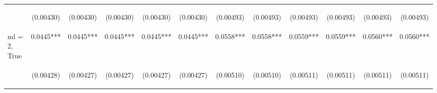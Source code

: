 \documentclass[]{article}
\begin{document}
\begin{center}
\begin{tabular}{lccccccccccc}
\vspace{4pt} & \begin{footnotesize}(0.00430)\end{footnotesize} & \begin{footnotesize}(0.00430)\end{footnotesize} & \begin{footnotesize}(0.00430)\end{footnotesize} & \begin{footnotesize}(0.00430)\end{footnotesize} & \begin{footnotesize}(0.00430)\end{footnotesize} & \begin{footnotesize}(0.00493)\end{footnotesize} & \begin{footnotesize}(0.00493)\end{footnotesize} & \begin{footnotesize}(0.00493)\end{footnotesize} & \begin{footnotesize}(0.00493)\end{footnotesize} & \begin{footnotesize}(0.00493)\end{footnotesize} & \begin{footnotesize}(0.00493)\end{footnotesize} \\
ml = 2, True & 0.0445*** & 0.0445*** & 0.0445*** & 0.0445*** & 0.0445*** & 0.0558*** & 0.0558*** & 0.0559*** & 0.0559*** & 0.0560*** & 0.0560*** \\
\vspace{4pt} & \begin{footnotesize}(0.00428)\end{footnotesize} & \begin{footnotesize}(0.00427)\end{footnotesize} & \begin{footnotesize}(0.00427)\end{footnotesize} & \begin{footnotesize}(0.00427)\end{footnotesize} & \begin{footnotesize}(0.00427)\end{footnotesize} & \begin{footnotesize}(0.00510)\end{footnotesize} & \begin{footnotesize}(0.00510)\end{footnotesize} & \begin{footnotesize}(0.00511)\end{footnotesize} & \begin{footnotesize}(0.00511)\end{footnotesize} & \begin{footnotesize}(0.00511)\end{footnotesize} & \begin{footnotesize}(0.00511)\end{footnotesize} \\

\end{tabular}
\end{center}
\end{document}
